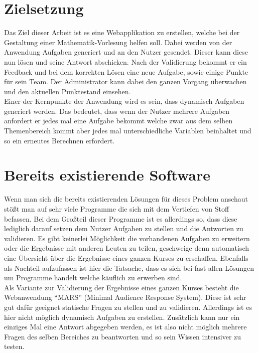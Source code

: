 \section{Zielsetzung}

Das Ziel dieser Arbeit ist es eine Webapplikation zu erstellen, welche bei der Gestaltung einer Mathematik-Vorlesung helfen soll. Dabei werden von der Anwendung Aufgaben generiert und an den Nutzer gesendet. Dieser kann diese nun lösen und seine Antwort abschicken. Nach der Validierung bekommt er ein Feedback und bei dem korrekten Lösen eine neue Aufgabe, sowie einige Punkte für sein Team. Der Administrator kann dabei den ganzen Vorgang überwachen und den aktuellen Punktestand einsehen. \\
Einer der Kernpunkte der Anwendung wird es sein, dass dynamisch Aufgaben generiert werden. Das bedeutet, dass wenn der Nutzer mehrere Aufgaben anfordert er jedes mal eine Aufgabe bekommt welche zwar aus dem selben Themenbereich kommt aber jedes mal unterschiedliche Variablen beinhaltet und so ein erneutes Berechnen erfordert.


\section{Bereits existierende Software}

Wenn man sich die bereits existierenden Lösungen für dieses Problem anschaut stößt man auf sehr viele Programme die sich mit dem Vertiefen von Stoff befassen. Bei dem Großteil dieser Programme ist es allerdings so, dass diese lediglich darauf setzen dem Nutzer Aufgaben zu stellen und die Antworten zu validieren. Es gibt keinerlei Möglichkeit die vorhandenen Aufgaben zu erweitern oder die Ergebnisse mit anderen Leuten zu teilen, geschweige denn automatisch eine Übersicht über die Ergebnisse eines ganzen Kurses zu erschaffen. Ebenfalls als Nachteil aufzufassen ist hier die Tatsache, dass es sich bei fast allen Lösungen um Programme handelt welche käuflich zu erwerben sind.\\

Als Variante zur Validierung der Ergebnisse eines ganzen Kurses besteht die Webanwendung ``MARS'' (Minimal Audience Response System). Diese ist sehr gut dafür geeignet statische Fragen zu stellen und zu validieren. Allerdings ist es hier nicht möglich dynamisch Aufgaben zu erstellen. Zusätzlich kann nur ein einziges Mal eine Antwort abgegeben werden, es ist also nicht möglich mehrere Fragen des selben Bereiches zu beantworten und so sein Wissen intensiver zu testen. \\

